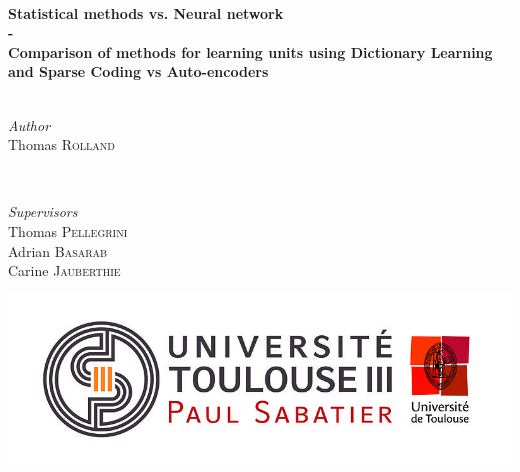 \documentclass[a4paper,10pt]{report}
\begin{document}
\begin{titlepage}
	
	\HRule\\[0.4cm]
	
	{\huge\bfseries Statistical methods vs. Neural network 
\\ \vspace{0.5cm}- \vspace{0.5cm} \\  Comparison of methods for learning units using Dictionary Learning and Sparse Coding vs Auto-encoders}\\[0.4cm] %
	
	\HRule\\[1.5cm]
	
	
	\begin{minipage}{0.4\textwidth}
		\begin{flushleft}
			\large
			\textit{Author}\\
			Thomas \textsc{Rolland} %
		\end{flushleft}
	\end{minipage}
	~
	\begin{minipage}{0.4\textwidth}
		\begin{flushright}
			\large
			\textit{Supervisors}\\
			Thomas \textsc{Pellegrini}\\ %
			Adrian \textsc{Basarab}\\ \vspace{0.2cm}
            Carine \textsc{Jauberthie}
            
		\end{flushright}
	\end{minipage}
	
% 	
	
	\vfill
	\begin{center}
 \includegraphics[scale=1]{Logo_UT3.jpg}
\end{center}


\end{titlepage}
\end{document}
